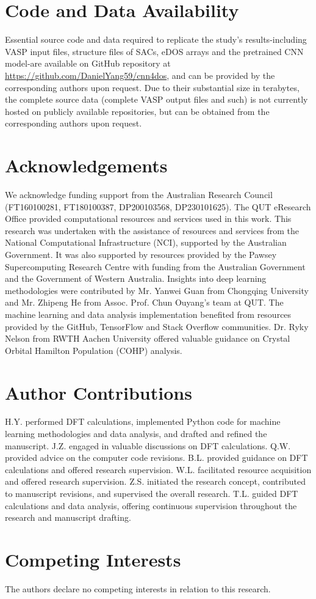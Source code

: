 \setcounter{section}{0}
\renewcommand{\thesection}{\Alph{section}}

\newpage
    \section{Code and Data Availability}
    Essential source code and data required to replicate the study's results-including VASP input files, structure files of SACs, eDOS arrays and the pretrained CNN model-are available on GitHub repository at \url{https://github.com/DanielYang59/cnn4dos}, and can be provided by the corresponding authors upon request.
    Due to their substantial size in terabytes, the complete source data (complete VASP output files and such) is not currently hosted on publicly available repositories, but can be obtained from the corresponding authors upon request.


    \section{Acknowledgements}
    We acknowledge funding support from the Australian Research Council (FT160100281, FT180100387, DP200103568, DP230101625).
    The QUT eResearch Office provided computational resources and services used in this work.
    This research was undertaken with the assistance of resources and services from the National Computational Infrastructure (NCI), supported by the Australian Government.
    It was also supported by resources provided by the Pawsey Supercomputing Research Centre with funding from the Australian Government and the Government of Western Australia.
    Insights into deep learning methodologies were contributed by Mr. Yanwei Guan from Chongqing University and Mr. Zhipeng He from Assoc. Prof. Chun Ouyang's team at QUT.
    The machine learning and data analysis implementation benefited from resources provided by the GitHub, TensorFlow and Stack Overflow communities.
    Dr. Ryky Nelson from RWTH Aachen University offered valuable guidance on Crystal Orbital Hamilton Population (COHP) analysis.


    \section{Author Contributions}
    H.Y. performed DFT calculations, implemented Python code for machine learning methodologies and data analysis, and drafted and refined the manuscript.
    J.Z. engaged in valuable discussions on DFT calculations.
    Q.W. provided advice on the computer code revisions.
    B.L. provided guidance on DFT calculations and offered research supervision.
    W.L. facilitated resource acquisition and offered research supervision.
    Z.S. initiated the research concept, contributed to manuscript revisions, and supervised the overall research.
    T.L. guided DFT calculations and data analysis, offering continuous supervision throughout the research and manuscript drafting.


    \section{Competing Interests}
    The authors declare no competing interests in relation to this research.

